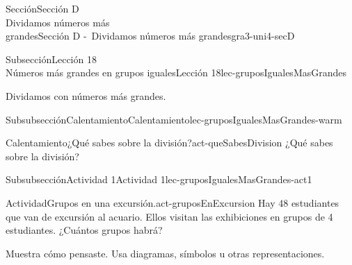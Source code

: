 \begin{sectionptx}{Sección}{{\Large Sección D\\}Dividamos números más\\grandes}{}{Sección D -~Dividamos números más grandes}{}{}{gra3-uni4-secD}
\vspace*{-3ex}
%
%
\typeout{************************************************}
\typeout{************************************************}
%
\begin{subsectionptx}{Subsección}{{\normalsize Lección 18\\[-0.05cm]}Números más grandes en grupos iguales}{}{Lección 18}{}{}{lec-gruposIgualesMasGrandes}
\begin{introduction}{}%
Dividamos con números más grandes.%
\end{introduction}%
%
%
\typeout{************************************************}
\typeout{************************************************}
%
\begin{subsubsectionptx}{Subsubsección}{Calentamiento}{}{Calentamiento}{}{}{lec-gruposIgualesMasGrandes-warm}
\begin{exploration}{Calentamiento}{¿Qué sabes sobre la división?}{act-queSabesDivision}%
¿Qué sabes sobre la división?%
\end{exploration}%
\end{subsubsectionptx}
%
%
\typeout{************************************************}
\typeout{************************************************}
%
\begin{subsubsectionptx}{Subsubsección}{Actividad 1}{}{Actividad 1}{}{}{lec-gruposIgualesMasGrandes-act1}
\begin{activity}{Actividad}{Grupos en una excursión.}{act-gruposEnExcursion}%
Hay 48 estudiantes que van de excursión al acuario. Ellos visitan las exhibiciones en grupos de 4 estudiantes. ¿Cuántos grupos habrá?%
\par
Muestra cómo pensaste. Usa diagramas, símbolos u otras representaciones.%
\end{activity}%
\end{subsubsectionptx}
%
%
\typeout{************************************************}

\end{subsectionptx}
\end{sectionptx}
